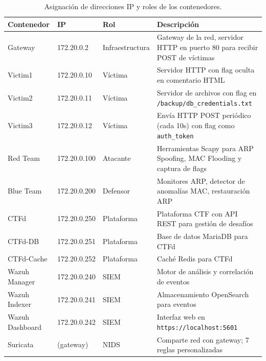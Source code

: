 \documentclass[12pt, a4paper]{article}
\begin{document}
\begin{table}[H]
    \centering
    \caption{Asignaci\'on de direcciones IP y roles de los contenedores.}
    \label{tab:ip-assignment}
    \begin{tabularx}{\textwidth}{|l|l|l|X|}
        \hline
        \textbf{Contenedor} & \textbf{IP} & \textbf{Rol} & \textbf{Descripci\'on} \\
        \hline\hline
        Gateway & 172.20.0.2 & Infraestructura & Gateway de la red, servidor HTTP en puerto 80 para recibir POST de v\'ictimas \\
        \hline
        Victim1 & 172.20.0.10 & V\'ictima & Servidor HTTP con flag oculta en comentario HTML \\
        \hline
        Victim2 & 172.20.0.11 & V\'ictima & Servidor de archivos con flag en \texttt{/backup/db\_credentials.txt} \\
        \hline
        Victim3 & 172.20.0.12 & V\'ictima & Env\'ia HTTP POST peri\'odico (cada 10s) con flag como \texttt{auth\_token} \\
        \hline
        Red Team & 172.20.0.100 & Atacante & Herramientas Scapy para ARP Spoofing, MAC Flooding y captura de flags \\
        \hline
        Blue Team & 172.20.0.200 & Defensor & Monitores ARP, detector de anomal\'ias MAC, restauraci\'on ARP \\
        \hline
        CTFd & 172.20.0.250 & Plataforma & Plataforma CTF con API REST para gesti\'on de desaf\'ios \\
        \hline
        CTFd-DB & 172.20.0.251 & Plataforma & Base de datos MariaDB para CTFd \\
        \hline
        CTFd-Cache & 172.20.0.252 & Plataforma & Cach\'e Redis para CTFd \\
        \hline
        Wazuh Manager & 172.20.0.240 & SIEM & Motor de an\'alisis y correlaci\'on de eventos \\
        \hline
        Wazuh Indexer & 172.20.0.241 & SIEM & Almacenamiento OpenSearch para eventos \\
        \hline
        Wazuh Dashboard & 172.20.0.242 & SIEM & Interfaz web en \texttt{https://localhost:5601} \\
        \hline
        Suricata & (gateway) & NIDS & Comparte red con gateway; 7 reglas personalizadas \\
        \hline
    \end{tabularx}
\end{table}
\end{document}
